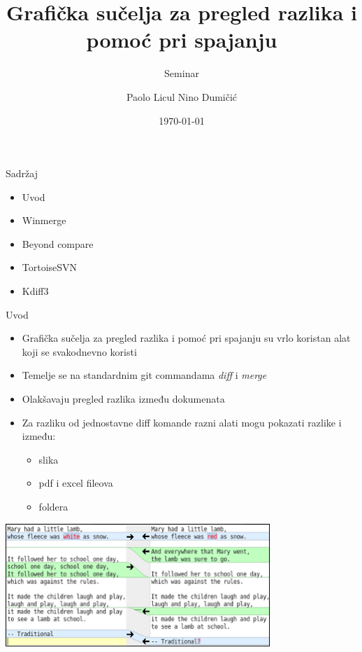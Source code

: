 \documentclass[10pt]{beamer}
\title{Grafička sučelja za pregled razlika i pomoć pri spajanju}
\subtitle{Seminar}
\date{\today}
\author{Paolo Licul Nino Dumičić}
\begin{document}
\maketitle

\begin{frame}{Sadržaj}
  \begin{itemize}
  \item Uvod
  \item Winmerge
  \item Beyond compare
  \item TortoiseSVN
  \item Kdiff3
  \end{itemize}
\end{frame}

\begin{frame}{Uvod}
	\begin{itemize}
		\item Grafička sučelja za pregled razlika i pomoć pri spajanju su vrlo koristan alat koji se svakodnevno koristi
		\item Temelje se na standardnim git commandama \emph{diff} i \emph{merge}
		\item Olakšavaju pregled razlika između dokumenata
		\item Za razliku od jednostavne diff komande razni alati mogu pokazati razlike i između: \begin{itemize}
		\item slika
		\item pdf i excel fileova
		\item foldera
		\end{itemize}
	\end{itemize} 
	
\includegraphics[width=10cm]{gui.png}
\end{frame}
\end{document}
